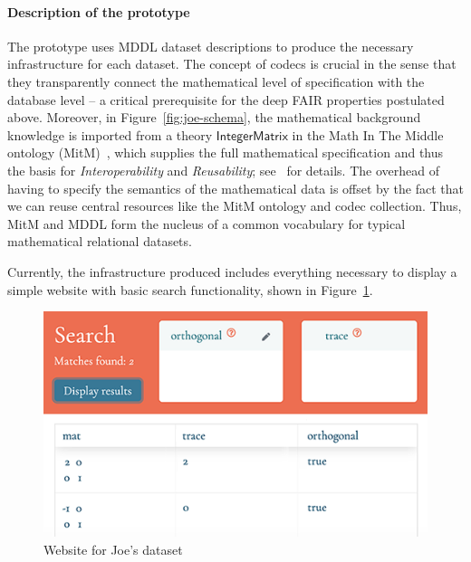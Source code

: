 \paragraph{Description of the \dmh prototype}
The prototype uses MDDL dataset descriptions to produce the necessary infrastructure for each dataset.
The concept of codecs is crucial in the sense that they transparently connect 
the mathematical level of specification with the database level -- 
a critical prerequisite for the deep FAIR properties postulated above.
Moreover, in Figure~\ref{fig:joe-schema}, the mathematical background knowledge is 
imported from a theory $\mathsf{IntegerMatrix}$ in the Math In The Middle ontology (MitM)~\cite{MitM:on}, 
which supplies the full mathematical specification and thus the basis for \emph{Interoperability} and \emph{Reusability}; see~\cite{BerKohRab:tumdi19,WieKohRab:vtuimkb17,KohMuePfe:kbimss17} for details.
The overhead of having to specify the semantics of the mathematical data is offset by the fact that we can reuse central resources like the MitM ontology and codec collection. 
Thus, MitM and MDDL form the nucleus of a common vocabulary for typical mathematical relational datasets. 

Currently, the infrastructure produced includes everything necessary
to display a simple website with basic search functionality, shown in Figure~\ref{fig:joe}.

\begin{figure}[ht]
  \includegraphics{data_joe.png}
  \caption{Website for Joe's dataset}\label{fig:joe}
\end{figure}


